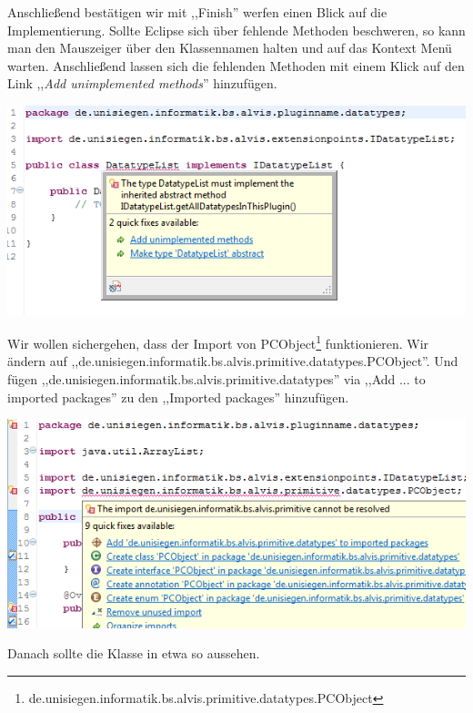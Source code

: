 \documentclass[10pt,a4paper]{article}
\begin{document}
Anschließend bestätigen wir mit ,,Finish'' werfen einen Blick auf die Implementierung.
Sollte Eclipse sich über fehlende Methoden beschweren, so kann man den Mauszeiger über den Klassennamen halten und auf das Kontext Menü warten. Anschließend lassen sich die fehlenden Methoden mit einem Klick auf den Link ,,\emph{Add unimplemented methods}'' hinzufügen.

\begin{center}
\includegraphics[scale=0.48]{images/new_plugin_datatypeslist_01}
\end{center}

Wir wollen sichergehen, dass der Import von PCObject\footnote{de.unisiegen.informatik.bs.alvis.primitive.datatypes.PCObject} funktionieren. Wir ändern auf ,,de.unisiegen.informatik.bs.alvis.primitive.datatypes.PCObject''. Und fügen ,,de.unisiegen.informatik.bs.alvis.primitive.datatypes'' via ,,Add ... to imported packages'' zu den ,,Imported packages'' hinzufügen.


\begin{center}
\includegraphics[scale=0.48]{images/new_plugin_datatypeslist_02}
\end{center}

Danach sollte die Klasse in etwa so aussehen.

\end{document}
